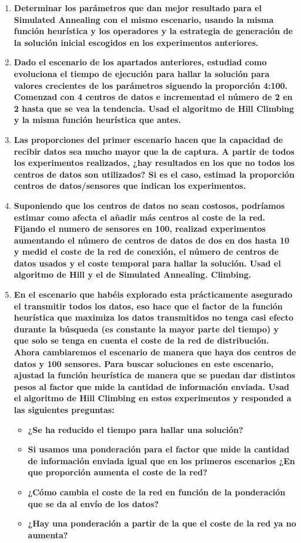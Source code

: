 \documentclass{article}
\begin{document}
\begin{enumerate}
  \item \textbf{Determinar los parámetros que dan mejor resultado para el Simulated Annealing con el mismo escenario, usando la misma función heurística y los operadores y la estrategia de generación de la solución inicial escogidos en los experimentos anteriores.}

  \item \textbf{Dado el escenario de los apartados anteriores, estudiad como evoluciona el tiempo de ejecución para hallar la solución para valores crecientes de los parámetros siguendo la proporción 4:100. Comenzad con 4 centros de datos e incrementad el número de 2 en 2 hasta que se vea la tendencia. Usad el algoritmo de Hill Climbing y la misma función heurística que antes.}

  \item \textbf{Las proporciones del primer escenario hacen que la capacidad de recibir datos sea mucho mayor que la de captura. A partir de todos los experimentos realizados, ¿hay resultados en los que no todos los centros de datos son utilizados? Si es el caso, estimad la proporción centros de datos/sensores que indican los experimentos.}

  \item \textbf{Suponiendo que los centros de datos no sean costosos, podríamos estimar como afecta el añadir más centros al coste de la red. Fijando el numero de sensores en 100, realizad experimentos aumentando el número de centros de datos de dos en dos hasta 10 y medid el coste de la red de conexión, el número de centros de datos usados y el coste temporal para hallar la solución. Usad el algoritmo de Hill y el de Simulated Annealing. Climbing.}

  \item \textbf{En el escenario que habéis explorado esta prácticamente asegurado el transmitir todos los datos, eso hace que el factor de la función heurística que maximiza los datos transmitidos no tenga casi efecto durante la búsqueda (es constante la mayor parte del tiempo) y que solo se tenga en cuenta el coste de la red de distribución. Ahora cambiaremos el escenario de manera que haya dos centros de datos y 100 sensores. Para buscar soluciones en este escenario, ajustad la función heurística de manera que se puedan dar distintos pesos al factor que mide la cantidad de información enviada. Usad el algoritmo de Hill Climbing en estos experimentos y responded a las siguientes preguntas:}
  \begin{itemize}
    \item \textbf{¿Se ha reducido el tiempo para hallar una solución?}
    \item \textbf{Si usamos una ponderación para el factor que mide la cantidad de información enviada igual que en los primeros escenarios ¿En que proporción aumenta el coste de la red?}
    \item \textbf{¿Cómo cambia el coste de la red en función de la ponderación que se da al envío de los datos?}
    \item \textbf{¿Hay una ponderación a partir de la que el coste de la red ya no aumenta?}
  \end{itemize}
\end{enumerate}
\end{document}
